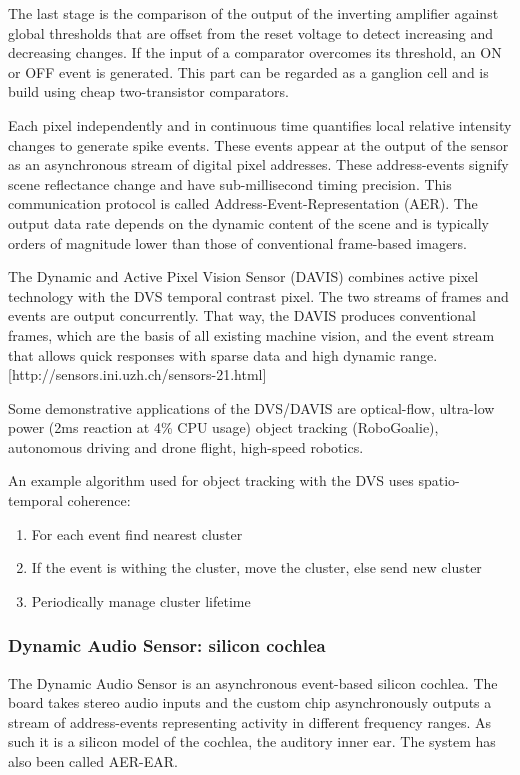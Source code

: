 \documentclass[main]{subfiles}
\begin{document}
The last stage is the comparison of the output of the inverting amplifier against global thresholds that are offset from the reset voltage to detect increasing and decreasing changes. If the input of a comparator overcomes its threshold, an ON or OFF event is generated. This part can be regarded as a ganglion cell and is build using cheap  two-transistor comparators.

Each pixel independently and in continuous time quantifies local relative intensity changes to generate spike events. These events appear at the output of the sensor as an asynchronous stream of digital pixel addresses. These address-events signify scene reflectance change and have sub-millisecond timing precision. This communication protocol is called Address-Event-Representation (AER). The output data rate depends on the dynamic content of the scene and is typically orders of magnitude lower than those of conventional frame-based imagers. 

The Dynamic and Active Pixel Vision Sensor (DAVIS) combines active pixel technology with the DVS temporal contrast pixel. The two streams of frames and events are output concurrently. That way, the DAVIS produces conventional frames, which are the basis of all existing machine vision, and the event stream that allows quick responses with sparse data and high dynamic range. [http://sensors.ini.uzh.ch/sensors-21.html]

Some demonstrative applications of the DVS/DAVIS are optical-flow, ultra-low power (2ms reaction at 4\% CPU usage) object tracking (RoboGoalie), autonomous driving and drone flight, high-speed robotics. 

An example algorithm used for object tracking with the DVS uses spatio-temporal coherence:
\begin{enumerate}
    \item For each event find nearest cluster
    \item If the event is withing the cluster, move the cluster, else send new cluster
    \item Periodically manage cluster lifetime
\end{enumerate}

\subsubsection{Dynamic Audio Sensor: silicon cochlea}

The Dynamic Audio Sensor is an asynchronous event-based silicon cochlea. The board takes stereo audio inputs and the custom chip asynchronously outputs a stream of address-events representing activity in different frequency ranges. As such it is a silicon model of the cochlea, the auditory inner ear. The system has also been called AER-EAR.
\end{document}
